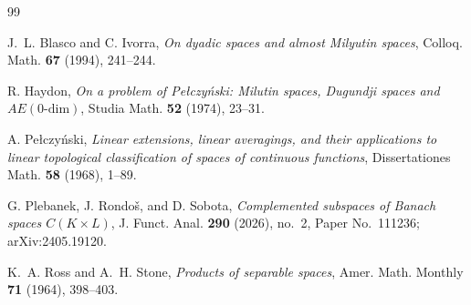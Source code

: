 \documentclass[11pt]{article}
\theoremstyle{definition}
\theoremstyle{remark}
\newcommand{\C}{C}
\begin{document}
\begin{thebibliography}{99}

J.~L. Blasco and C. Ivorra,
\emph{On dyadic spaces and almost Milyutin spaces},
Colloq. Math. \textbf{67} (1994), 241--244.

R. Haydon,
\emph{On a problem of Pe\l czy\'nski: Milutin spaces, Dugundji spaces and
\(AE(0\text{-dim})\)},
Studia Math. \textbf{52} (1974), 23--31.

A. Pe\l czy\'nski,
\emph{Linear extensions, linear averagings, and their applications to linear
topological classification of spaces of continuous functions},
Dissertationes Math. \textbf{58} (1968), 1--89.

G. Plebanek, J. Rondo\v{s}, and D. Sobota,
\emph{Complemented subspaces of Banach spaces \(\C(K\times L)\)},
J. Funct. Anal. \textbf{290} (2026), no.~2, Paper No.~111236; arXiv:2405.19120.

K.~A. Ross and A.~H. Stone,
\emph{Products of separable spaces},
Amer. Math. Monthly \textbf{71} (1964), 398--403.

\end{thebibliography}
\end{document}

